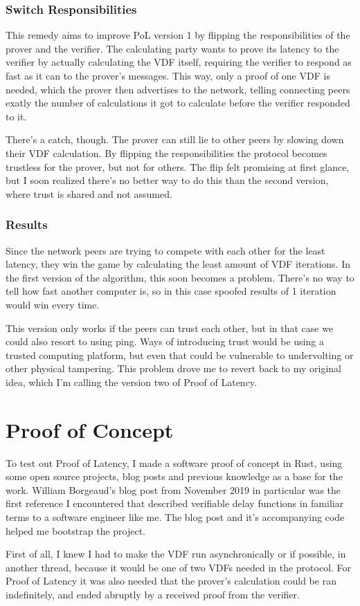 \subsection{Switch Responsibilities}
This remedy aims to improve PoL version 1 by flipping the responsibilities of the prover and the verifier. The calculating party wants to prove its latency to the verifier by actually calculating the VDF itself, requiring the verifier to respond as fast as it can to the prover's messages. This way, only a proof of one VDF is needed, which the prover then advertises to the network, telling connecting peers exatly the number of calculations it got to calculate before the verifier responded to it. 

There's a catch, though. The prover can still lie to other peers by slowing down their VDF calculation. By flipping the responsibilities the protocol becomes trustless for the prover, but not for others. The flip felt promising at first glance, but I soon realized there's no better way to do this than the second version, where trust is shared and not assumed.

\subsection{Results}
Since the network peers are trying to compete with each other for the least latency, they win the game by calculating the least amount of VDF iterations. In the first version of the algorithm, this soon becomes a problem. There's no way to tell how fast another computer is, so in this case spoofed results of 1 iteration would win every time.

This version only works if the peers can trust each other, but in that case we could also resort to using ping. Ways of introducing trust would be using a trusted computing platform, but even that could be vulnerable to undervolting or other physical tampering. This problem drove me to revert back to my original idea, which I'm calling the version two of Proof of Latency.


\chapter{Proof of Concept}
\label{Proof of Concept}
To test out Proof of Latency, I made a software proof of concept in Rust, using some open source projects, blog posts and previous knowledge as a base for the work. William Borgeaud's blog post\cite{Borgeaud2019-wk} from November 2019 in particular was the first reference I encountered that described verifiable delay functions in familiar terms to a software engineer like me. The blog post and it's accompanying code\cite{Borgeaud2019-nn} helped me bootstrap the project.

First of all, I knew I had to make the VDF run asynchronically or if possible, in another thread, because it would be one of two VDFs needed in the protocol. For Proof of Latency it was also needed that the prover's calculation could be ran indefinitely, and ended abruptly by a received proof from the verifier.
